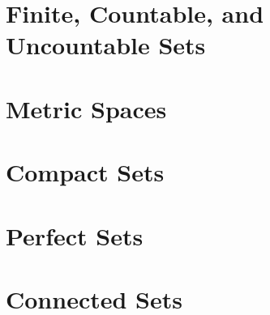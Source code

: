 \documentclass[../../templates/chapter]{subfiles}
\begin{document}
\section{Finite, Countable, and Uncountable Sets}\label{sec:finite-countable-and-uncountable-sets}


\section{Metric Spaces}\label{sec:metric-spaces}


\section{Compact Sets}\label{sec:compact-sets}


\section{Perfect Sets}\label{sec:perfect-sets}


\section{Connected Sets}\label{sec:connected-sets}

\end{document}
